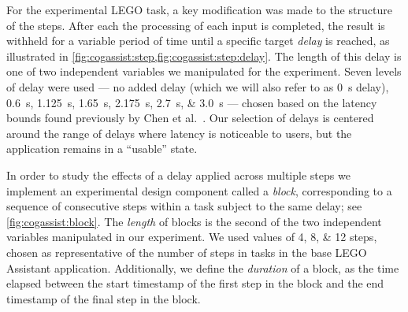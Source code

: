 For the experimental LEGO task, a key modification was made to the structure of the steps.
After each the processing of each input is completed, the result is withheld for a variable period of time until a specific target \emph{delay} is reached, as illustrated in \cref{fig:cogassist:step,fig:cogassist:step:delay}.
The length of this delay is one of two independent variables we manipulated for the experiment.
Seven levels of delay were used --- no added delay (which we will also refer to as \SI{0}{\second} delay), \SIlist{0.6;1.125;1.65;2.175;2.7;3.0}{\second} --- chosen based on the latency bounds found previously by Chen et al.~\cite{Chen:AnEmpiricalStudyOfLatency}.
Our selection of delays is centered around the range of delays where latency is noticeable to users, but the application remains in a ``usable'' state.

In order to study the effects of a delay applied across multiple steps we implement an experimental design component called a \emph{block}, corresponding to a sequence of consecutive steps within a task subject to the same delay; see \cref{fig:cogassist:block}.
The \emph{length} of blocks is the second of the two independent variables manipulated in our experiment.
We used values of \numlist{4;8;12} steps, chosen as representative of the number of steps in tasks in the base LEGO Assistant application.
Additionally, we define the \emph{duration} of a block, as the time elapsed between the start timestamp of the first step in the block and the end timestamp of the final step in the block.


